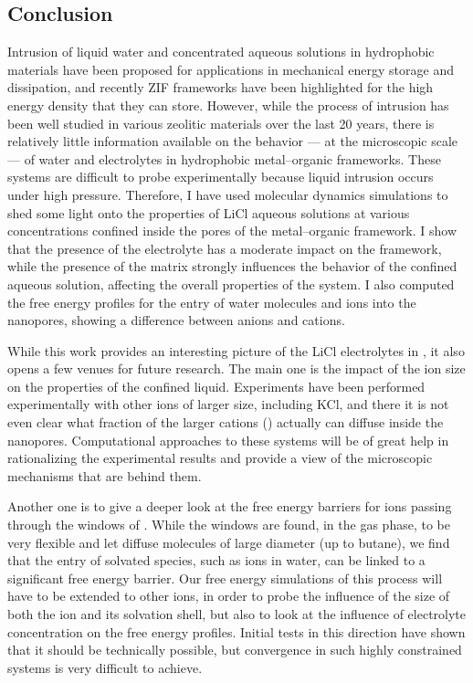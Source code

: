 \documentclass[thesis]{subfiles}
\begin{document}
\clearpage
\subsection*{Conclusion}

Intrusion of liquid water and concentrated aqueous solutions in hydrophobic
materials have been proposed for applications in mechanical energy storage and
dissipation, and recently ZIF frameworks have been highlighted for the high
energy density that they can store. However, while the process of intrusion has
been well studied in various zeolitic materials over the last 20 years, there is
relatively little information available on the behavior --- at the microscopic
scale --- of water and electrolytes in hydrophobic metal--organic frameworks.
These systems are difficult to probe experimentally because liquid intrusion
occurs under high pressure. Therefore, I have used molecular dynamics
simulations to shed some light onto the properties of LiCl aqueous solutions at
various concentrations confined inside the pores of the  metal--organic
framework. I show that the presence of the electrolyte has a moderate impact on
the  framework, while the presence of the  matrix strongly influences
the behavior of the confined aqueous solution, affecting the overall properties
of the system. I also computed the free energy profiles for the entry of water
molecules and ions into the nanopores, showing a difference between anions and
cations.

While this work provides an interesting picture of the LiCl electrolytes in
, it also opens a few venues for future research. The main one is the
impact of the ion size on the properties of the confined liquid. Experiments
have been performed experimentally with other ions of larger size, including
KCl, and there it is not even clear what fraction of the larger cations
() actually can diffuse inside the nanopores. Computational approaches to
these systems will be of great help in rationalizing the experimental results
and provide a view of the microscopic mechanisms that are behind them.

Another one is to give a deeper look at the free energy barriers for ions
passing through the windows of . While the windows are found, in the gas
phase, to be very flexible and let diffuse molecules of large diameter (up to
butane), we find that the entry of solvated species, such as ions in water, can
be linked to a significant free energy barrier. Our free energy simulations of
this process will have to be extended to other ions, in order to probe the
influence of the size of both the ion and its solvation shell, but also to look
at the influence of electrolyte concentration on the free energy profiles.
Initial tests in this direction have shown that it should be technically
possible, but convergence in such highly constrained systems is very difficult
to achieve.
\end{document}
